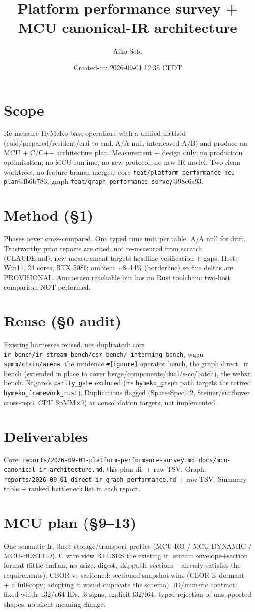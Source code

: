 \documentclass[11pt]{article}
\title{Platform performance survey + MCU canonical-IR architecture}\author{Aiko Seto}
\date{Created-at: 2026-09-01 12:35 CEDT}
\begin{document}
\maketitle
\section*{Scope}
Re-measure HyMeKo base operations with a unified method (cold/prepared/resident/end-to-end, A/A null,
interleaved A/B) and produce an MCU + C/C++ architecture plan. Measurement + design only: no production
optimisation, no MCU runtime, no new protocol, no new IR model. Two clean worktrees, no feature branch
merged: core \texttt{feat/platform-performance-mcu-plan}@fb6b783, graph
\texttt{feat/graph-performance-survey}@98c6a93.
\section*{Method (\S1)}
Phases never cross-compared. One typed time unit per table. A/A null for drift. Trustworthy prior
reports are cited, not re-measured from scratch (CLAUDE.md); new measurement targets headline
verification + gaps. Host: Win11, 24 cores, RTX 5080; ambient $\sim$8--14\% (borderline) so fine deltas
are PROVISIONAL. Amaterasu reachable but has no Rust toolchain: two-host comparison NOT performed.
\section*{Reuse (\S0 audit)}
Existing harnesses reused, not duplicated: core \texttt{ir\_bench/ir\_stream\_bench/csr\_bench/
interning\_bench}, wgpu \texttt{spmm/chain/arena}, the incidence \texttt{\#[ignore]} operator bench, the
graph direct\_ir bench (extended in place to cover berge/components/dual/s-cc/batch), the webxr bench.
Nagare's \texttt{parity\_gate} excluded (its \texttt{hymeko\_graph} path targets the retired
\texttt{hymeko\_framework\_rust}). Duplications flagged (SparseSpec$\times$2, Steiner/sunflower cross-repo,
CPU SpMM$\times$2) as consolidation targets, not implemented.
\section*{Deliverables}
Core: \texttt{reports/2026-09-01-platform-performance-survey.md}, \texttt{docs/mcu-canonical-ir-architecture.md},
this plan dir + raw TSV. Graph: \texttt{reports/2026-09-01-direct-ir-graph-performance.md} + raw TSV.
Summary table + ranked bottleneck list in each report.
\section*{MCU plan (\S9--13)}
One semantic Ir, three storage/transport profiles (MCU-RO / MCU-DYNAMIC / MCU-HOSTED). C wire view REUSES
the existing ir\_stream envelope+section format (little-endian, no usize, digest, skippable sections --
already satisfies the requirements). CBOR vs sectioned: sectioned snapshot wins (CBOR is dormant + a
full-copy; adopting it would duplicate the schema). ID/numeric contract: fixed-width u32/u64 IDs, i8
signs, explicit f32/f64, typed rejection of unsupported shapes, no silent meaning change.
\end{document}
